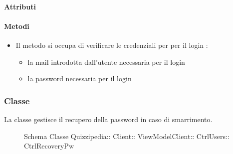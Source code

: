 \paragraph{Attributi}
\paragraph{Metodi}
\begin{itemize}
\item {}
\newline
Il metodo si occupa di verificare le credenziali per per il login
\newline
{} :
\begin{itemize}
\item {}
\newline
la mail introdotta dall'utente necessaria per il login
\item {}
\newline
la password necessaria per il login
\end{itemize}
\end{itemize}
\subsubsection{Classe }
La classe gestisce il recupero della password in caso di smarrimento.
\begin{figure}[H]
\centering
\noindent{}
\caption[Schema Classe CtrlRecoveryPw]{Schema Classe Quizzipedia:: Client:: ViewModelClient:: CtrlUsers:: CtrlRecoveryPw}
\end{figure}

